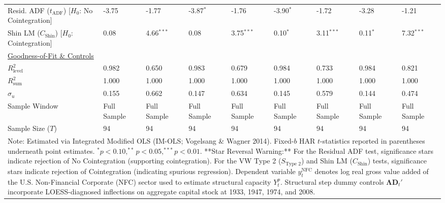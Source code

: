 \begin{landscape}
\begin{table}[H]
\begin{tabular}{p{5.2cm}p{1.5cm}p{1.5cm}p{1.5cm}p{1.5cm}p{1.5cm}p{1.5cm}p{1.5cm}p{1.5cm}}
\makecell[l]{Resid. ADF ($t_{\text{ADF}}$) \\ {\scriptsize [$H_0$: No Cointegration]}} & -3.75 & -1.77 & -3.87$^{*}$ & -1.76 & -3.90$^{*}$ & -1.72 & -3.28 & -1.21  \\
\makecell[l]{Shin LM ($C_{\text{Shin}}$) \\ {\scriptsize [$H_0$: Cointegration]}} & 0.08 & 4.66$^{***}$ & 0.08 & 3.75$^{***}$ & 0.10$^{*}$ & 3.11$^{***}$ & 0.11$^{*}$ & 7.32$^{***}$  \\
\midrule
\multicolumn{9}{l}{\underline{Goodness-of-Fit \& Controls}} \\
$R_{\text{level}}^2$ & 0.982 & 0.650 & 0.983 & 0.679 & 0.984 & 0.733 & 0.984 & 0.821  \\
$R_{\text{sum}}^2$ & 1.000 & 1.000 & 1.000 & 1.000 & 1.000 & 1.000 & 1.000 & 1.000  \\
$\hat{\sigma}_u$ & 0.155 & 0.662 & 0.147 & 0.634 & 0.145 & 0.579 & 0.144 & 0.474  \\
Sample Window & Full Sample & Full Sample & Full Sample & Full Sample & Full Sample & Full Sample & Full Sample & Full Sample  \\
Sample Size ($T$) & 94 & 94 & 94 & 94 & 94 & 94 & 94 & 94  \\
\bottomrule
\multicolumn{9}{p{18.5cm}}{\footnotesize Note: Estimated via Integrated Modified OLS (IM-OLS; Vogelsang \& Wagner 2014). Fixed-$b$ HAR $t$-statistics reported in parentheses underneath point estimates. $^*p<0.10, ^{**}p<0.05, ^{***}p<0.01$. **Star Reversal Warning:** For the Residual ADF test, significance stars indicate rejection of No Cointegration (supporting cointegration). For the VW Type 2 ($S_{\text{Type 2}}$) and Shin LM ($C_{\text{Shin}}$) tests, significance stars indicate rejection of Cointegration (indicating spurious regression). Dependent variable $y_t^{\text{NFC}}$ denotes log real gross value added of the U.S. Non-Financial Corporate (NFC) sector used to estimate structural capacity $Y_t^p$. Structural step dummy controls $\boldsymbol{\Lambda} \mathbf{D}_t'$ incorporate LOESS-diagnosed inflections on aggregate capital stock at 1933, 1947, 1974, and 2008.}
\end{tabular}
\end{table}
\end{landscape}
